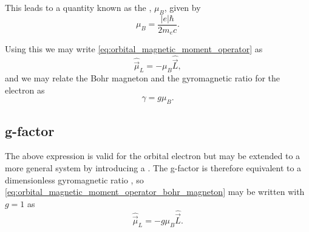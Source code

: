 This leads to a quantity known as the \textbf{}, $\mu_B$, given by \cite{Ramamurti1995-wg}
\begin{equation}
	\mu_B = \frac{|e|\hbar}{2m_e c}.
	\label{eq:bohr_magneton}
\end{equation}

Using this we may write \eqref{eq:orbital_magnetic_moment_operator} as
\begin{equation}
	\hat{\vec{\mu}}_L = -\mu_B\hat{\vec{L}},
	\label{eq:orbital_magnetic_moment_operator_bohr_magneton}
\end{equation}
and we may relate the Bohr magneton and the gyromagnetic ratio for the electron as 
\begin{equation}
    \gamma = g\mu_B.
    \label{eq:}
\end{equation}


\subsection{g-factor}
The above expression is valid for the orbital electron but may be extended to a more general system by introducing a . The g-factor is therefore equivalent to a dimensionless gyromagnetic ratio \cite{giancoli2008physics}, so \eqref{eq:orbital_magnetic_moment_operator_bohr_magneton} may be written with $g=1$ as
\begin{equation}
	\hat{\vec{\mu}}_L = -g\mu_B\hat{ \vec{L}}.
	\label{eq:orbital_magnetic_moment_operator_bohr_magneton_g_factor}
\end{equation}

